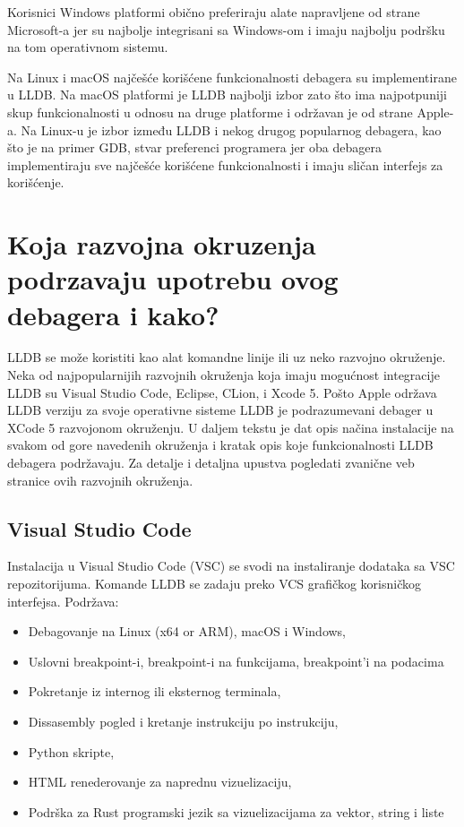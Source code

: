 \documentclass[a4paper]{article}
\begin{document}
Korisnici Windows platformi obično preferiraju alate napravljene od strane Microsoft-a jer su najbolje integrisani sa Windows-om i imaju najbolju podršku na tom operativnom sistemu.

Na Linux i macOS najčešće korišćene funkcionalnosti debagera su implementirane u LLDB. Na macOS platformi je LLDB najbolji izbor zato što ima najpotpuniji skup funkcionalnosti u odnosu na druge platforme i održavan je od strane Apple-a. Na Linux-u je izbor između LLDB i nekog drugog popularnog debagera, kao što je na primer GDB, stvar preferenci programera jer oba debagera implementiraju sve najčešće korišćene funkcionalnosti i imaju sličan interfejs za korišćenje.

\section{Koja razvojna okruzenja podrzavaju upotrebu ovog debagera i kako?}
\label{subsec:Koja razvojna okruzenja podrzavaju upotrebu ovog debagera i kako?}

LLDB se može koristiti kao alat komandne linije ili uz neko razvojno okruženje. Neka od najpopularnijih razvojnih okruženja koja imaju mogućnost integracije LLDB su Visual Studio Code, Eclipse, CLion, i Xcode 5. Pošto Apple održava LLDB verziju za svoje operativne sisteme LLDB je podrazumevani debager u XCode 5 razvojonom okruženju. 
U daljem tekstu je dat opis načina instalacije na svakom od gore navedenih okruženja i kratak opis koje funkcionalnosti LLDB debagera podržavaju. Za detalje i detaljna upustva pogledati zvanične veb stranice ovih razvojnih okruženja.

\subsection{Visual Studio Code}
Instalacija u Visual Studio Code (VSC) se svodi na instaliranje dodataka sa VSC repozitorijuma. Komande LLDB se zadaju preko VCS grafičkog korisničkog interfejsa. 
Podržava:
\begin{itemize}
\item Debagovanje na Linux (x64 or ARM), macOS i Windows,
\item Uslovni breakpoint-i, breakpoint-i na funkcijama, breakpoint'i na podacima
\item Pokretanje iz internog ili eksternog terminala,
\item Dissasembly pogled i kretanje instrukciju po instrukciju,
\item Python skripte,
\item HTML renederovanje za naprednu vizuelizaciju,
\item Podrška za Rust programski jezik sa vizuelizacijama za vektor, string i liste
\end{itemize}
\end{document}
